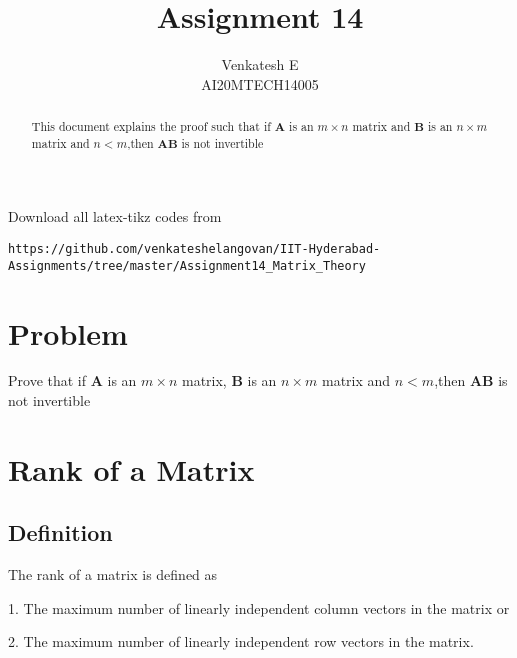 \documentclass[journal,12pt,twocolumn]{IEEEtran}
\begin{document}
\makeatletter
{}
\makeatother
\let\StandardTheFigure\thefigure
\let\vec\mathbf
\renewcommand{\thefigure}{\theproblem}
\def\putbox#1#2#3{\makebox[0in][l]{\makebox[#1][l]{}\raisebox{\baselineskip}[0in][0in]{\raisebox{#2}[0in][0in]{#3}}}}
     \def\rightbox#1{\makebox[0in][r]{#1}}
     \def\centbox#1{\makebox[0in]{#1}}
     \def\topbox#1{\raisebox{-\baselineskip}[0in][0in]{#1}}
     \def\midbox#1{\raisebox{-0.5\baselineskip}[0in][0in]{#1}}
\vspace{3cm}
\title{Assignment 14}
\author{Venkatesh E\\AI20MTECH14005}
\maketitle
\newpage
\bigskip
\renewcommand{\thefigure}{\theenumi}
\renewcommand{\thetable}{\theenumi}
\begin{abstract}
This document explains the proof such that if $\vec{A}$ is an $m\times n$ matrix and $\vec{B}$ is an $n\times m$ matrix and $n<m$,then $\vec{A}\vec{B}$ is not invertible
\end{abstract}
Download all latex-tikz codes from 
%
\begin{lstlisting}
https://github.com/venkateshelangovan/IIT-Hyderabad-Assignments/tree/master/Assignment14_Matrix_Theory
\end{lstlisting}
\section{Problem}
Prove that if  $\vec{A}$ is an $m\times n$ matrix, $\vec{B}$ is an $n\times m$ matrix and $n<m$,then $\vec{A}\vec{B}$ is not invertible
\section{Rank of a Matrix}
\subsection{Definition}
The rank of a matrix is defined as 

1. The maximum number of linearly independent column vectors in the matrix or

2. The maximum number of linearly independent row vectors in the matrix.
\end{document}
